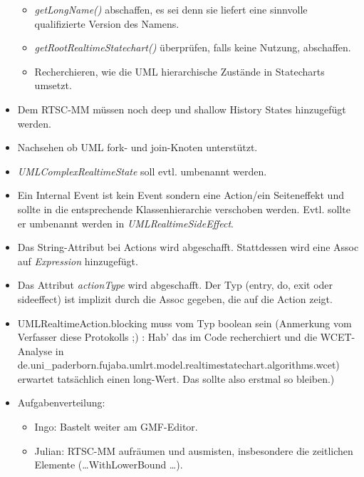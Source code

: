 \documentclass[11pt,a4paper]{article}
\begin{document}
\begin{itemize}
\begin{itemize}
      \item \emph{getLongName()} abschaffen, es sei denn sie liefert eine
      sinnvolle qualifizierte Version des Namens.
      \item \emph{getRootRealtimeStatechart()} überprüfen, falls keine Nutzung,
      abschaffen.
      \item Recherchieren, wie die UML hierarchische Zustände in
      Statecharts umsetzt.
    \end{itemize}
    \item Dem RTSC-MM müssen noch deep und shallow History States hinzugefügt
    werden.
    \item Nachsehen ob UML fork- und join-Knoten unterstützt.
    \item \emph{UMLComplexRealtimeState} soll evtl. umbenannt werden.
    \item Ein Internal Event ist kein Event sondern eine Action/ein Seiteneffekt
    und sollte in die entsprechende Klassenhierarchie verschoben werden. Evtl.
    sollte er umbenannt werden in \emph{UMLRealtimeSideEffect}.
    \item Das String-Attribut bei Actions wird abgeschafft. Stattdessen wird
    eine Assoc auf \emph{Expression} hinzugefügt.
    \item Das Attribut \emph{actionType} wird abgeschafft. Der Typ (entry, do,
    exit oder sideeffect) ist implizit durch die Assoc gegeben, die auf die
    Action zeigt.
    \item UMLRealtimeAction.blocking muss vom Typ boolean sein (Anmerkung vom
    Verfasser diese Protokolls ;) : Hab' das im Code recherchiert und die
    WCET-Analyse in
    de.uni\_paderborn.fujaba.umlrt.model.realtimestatechart.algorithms.wcet)
    erwartet tatsächlich einen long-Wert. Das sollte also erstmal so bleiben.)
    \item Aufgabenverteilung:
    \begin{itemize}
      \item Ingo: Bastelt weiter am GMF-Editor.
      \item Julian: RTSC-MM aufräumen und ausmisten, insbesondere die zeitlichen
      Elemente (\ldots WithLowerBound \ldots).
    \end{itemize}
\end{itemize}
\end{document}
